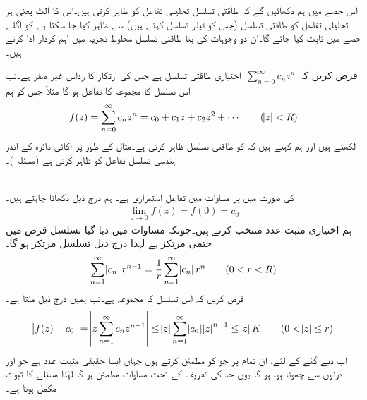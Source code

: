 اس حصے میں ہم دکھائیں گے کہ طاقتی تسلسل تحلیلی تفاعل کو ظاہر کرتی ہیں۔اس کا الٹ یعنی ہر تحلیلی تفاعل کو طاقتی تسلسل (جس کو ٹیلر تسلسل کہتے ہیں) سے ظاہر کیا جا سکتا ہے کو اگلے حصے میں ثابت کیا جائے گا۔ان دو وجوہات کی بنا طاقتی تسلسل مخلوط تجزیہ میں اہم کردار ادا کرتے ہیں۔

فرض کریں کہ 
$\,\sum_{n=0}^{\infty}c_nz^n\,$
اختیاری طاقتی تسلسل ہے جس کی ارتکاز کا رداس  غیر صفر ہے۔تب اس تسلسل کا مجموعہ  کا تفاعل ہو گا مثلاً  جس کو ہم
\begin{align}\label{مساوات_ٹیلر_طاقتی_تسلسل_اور_تحلیلی_تفاعل_الف}
f(z)=\sum\limits_{n=0}^{\infty} c_nz^n =c_0+c_1z+c_2z^2+\cdots\quad\quad (\abs{z}<R)
\end{align}
لکھتے ہیں اور ہم کہتے ہیں کہ  کو طاقتی تسلسل ظاہر کرتی ہے۔مثال کے طور پر اکائی دائرہ  کے اندر  ہندسی تسلسل  تفاعل  کو ظاہر کرتی ہے (مسئلہ )۔

\quad {}\\
 کی صورت میں  پر  مساوات  میں تفاعل   استمراری ہے۔
\quad
ہم درج ذیل دکھانا چاہتے ہیں۔
\begin{align}\label{مساوات_ٹیلر_طاقتی_تسلسل_اور_تحلیلی_تفاعل_ب}
\lim_{z\to 0} f(z)=f(0)=c_0
\end{align}
ہم اختیاری مثبت عدد  منتخب کرتے ہیں۔چونکہ مساوات  میں دیا گیا تسلسل  قرص  میں حتمی مرتکز ہے لہٰذا درج ذیل تسلسل مرتکز ہو گا۔
\begin{align*}
\sum\limits_{n=1}^{\infty}\abs{c_n}r^{n-1}=\frac{1}{r}\sum\limits_{n=1}^{\infty} \abs{c_n}r^n\quad \quad (0<r<R)
\end{align*}
فرض کریں کہ اس تسلسل کا مجموعہ  ہے۔تب ہمیں درج ذیل ملتا ہے۔
\begin{align*}
\abs{f(z)-c_0}=\abs{z\sum\limits_{n=1}^{\infty} c_n z^{n-1}}\le \abs{z}\sum\limits_{n=1}^{\infty}\abs{c_n}\abs{z}^{n-1}\le \abs{z}K\quad \quad (0<\abs{z}\le r)
\end{align*}
اب دیے گئے   کے لئے، ان تمام  پر جو  کو مطمئن کرتے ہوں جہاں  ایسا حقیقی مثبت عدد ہے جو  اور  دونوں سے چھوٹا ہو،   ہو گا۔یوں حد کی تعریف کے تحت مساوات  مطمئن ہو گا لہٰذا مسئلے کا ثبوت مکمل ہوتا ہے۔ 


